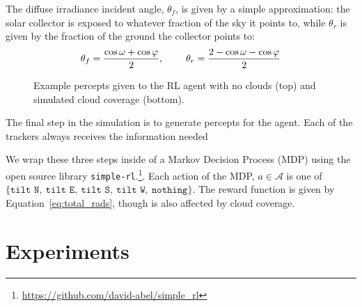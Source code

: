 \documentclass{article}
\newcommand{\mc}{\mathcal}
\begin{document}
The diffuse irradiance incident angle, $\theta_f$, is given by a simple approximation: the solar collector is exposed to whatever fraction of the sky it points to, while $\theta_r$ is given by the fraction of the ground the collector points to:
\begin{equation}
\theta_f = \frac{\cos \omega + \cos \varphi}{2}, \hspace{8mm} \theta_r = \frac{2 - \cos\omega - \cos \varphi}{2}
\end{equation}

\begin{figure}[t]
\begin{center}
 \hspace{16mm} %
\caption{Example percepts given to the RL agent with no clouds (top) and simulated cloud coverage (bottom).}
\end{center}
\end{figure}

The final step in the simulation is to generate percepts for the agent. Each of the trackers always receives the information needed 

We wrap these three steps inside of a Markov Decision Process (MDP) using the open source library \texttt{simple-rl}.\footnote{\url{https://github.com/david-abel/simple_rl}}.  Each action of the MDP, $a \in \mc{A}$ is one of $\{\texttt{tilt N},\ \texttt{tilt E},\ \texttt{tilt S},\ \texttt{tilt W},\ \texttt{nothing}\}$. The reward function is given by Equation~\ref{eq:total_rads}, though is also affected by cloud coverage.





\section{Experiments}
\end{document}
